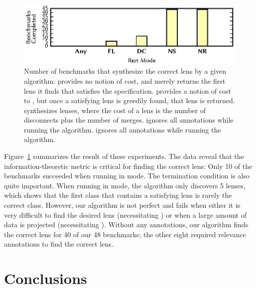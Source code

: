 \documentclass[12pt]{article}
\begin{document}
{\begin{figure}[t]
  \includegraphics{metrics_importance}
  \vspace{-2ex}
  \caption{Number of benchmarks that synthesize the correct lens by a given
    algorithm. \AnyOpt{} provides no notion of cost, and merely returns the
    first lens it finds that satisfies the specification. \FLOpt{} provides a
    notion of cost to \GreedySynth, but once a satisfying lens is greedily
    found, that lens is returned. \CCOpt{} synthesizes lenses, where the cost of
    a lens is the number of disconnects plus the number of merges. \NSOpt{}
    ignores all \Skip annotations while running the algorithm. \NROpt{} ignores
    all \SRequire annotations while running the algorithm.}
  \label{fig:metric}
\end{figure}

Figure~\ref{fig:metric} summarizes the result of these experiments. The data
reveal that the information-theoretic metric is critical for finding the correct
lens: Only 10 of the benchmarks succeeded when running in \CCOpt{} mode. The
termination condition is also quite important. When running in \FLOpt{} mode,
the algorithm only discovers 5 lenses, which shows that the first class that
contains a satisfying lens is rarely the correct class. However, our algorithm
is not perfect and fails when either it is very difficult to find the desired
lens (necessitating \SRequire) or when a large amount of data is projected
(necessitating \Skip). Without any annotations, our algorithm finds the correct
lens for 40 of our 48 benchmarks; the other eight required relevance
annotations to find the correct lens.

\section{Conclusions}

}
\end{document}
